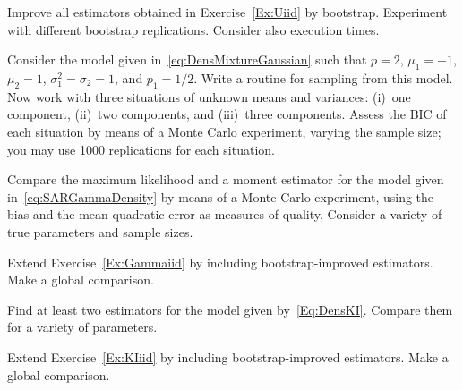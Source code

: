 \begin{exer}
Improve all estimators obtained in Exercise~\ref{Ex:Uiid} by bootstrap.
Experiment with different bootstrap replications.
Consider also execution times.
\end{exer}

\begin{exer}
Consider the model given in~\eqref{eq:DensMixtureGaussian} such that $p=2$, $\mu_1=-1$, $\mu_2=1$, $\sigma_1^2=\sigma_2=1$, and $p_1=1/2$.
Write a routine for sampling from this model.
Now work with three situations of unknown means and variances:
(i)~one component, (ii)~two components, and (iii)~three components.
Assess the BIC of each situation by means of a Monte Carlo experiment, varying the sample size; you may use \num{1000} replications for each situation.
\end{exer}

\begin{exer}\label{Ex:Gammaiid}
Compare the maximum likelihood and a moment estimator for the model given in~\eqref{eq:SARGammaDensity} by means of a Monte Carlo experiment, using the bias and the mean quadratic error as measures of quality.
Consider a variety of true parameters and sample sizes.
\end{exer}

\begin{exer}
Extend Exercise~\ref{Ex:Gammaiid} by including bootstrap-improved estimators.
Make a global comparison.
\end{exer}

\begin{exer}\label{Ex:KIiid}
Find at least two estimators for the model given by~\eqref{Eq:DensKI}.
Compare them for a variety of parameters.
\end{exer}

\begin{exer}
Extend Exercise~\ref{Ex:KIiid} by including bootstrap-improved estimators.
Make a global comparison.
\end{exer}

